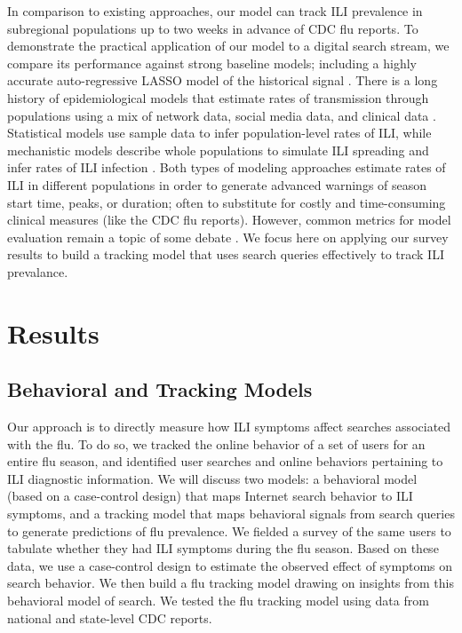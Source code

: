 \documentclass[fleqn,10pt]{wlscirep}
\begin{document}
In comparison to existing approaches, our model can track ILI prevalence in subregional populations up to two weeks in advance of CDC flu reports. To demonstrate the practical application of our model to a digital search stream, we compare its performance against strong baseline models; including a highly accurate auto-regressive LASSO model of the historical signal \cite{yang_etal_2015}. There is a long history of epidemiological models that estimate rates of transmission through populations using a mix of network data, social media data, and clinical data \cite{ginsberg_etal_2009,culotta2010towards,bodnar2013validating,nsoesie2014guess,generous2014global,yang_etal_2015inference,yang_etal_2015,biggerstaff_etal_2016,zhang2017forecasting}. Statistical models use sample data to infer population-level rates of ILI, while mechanistic models describe whole populations to simulate ILI spreading and infer rates of ILI infection \cite{biggerstaff_etal_2016}. Both types of modeling approaches estimate rates of ILI in different populations in order to generate advanced warnings of season start time, peaks, or duration; often to substitute for costly and time-consuming clinical measures (like the CDC flu reports). However, common metrics for model evaluation remain a topic of some debate \cite{biggerstaff_etal_2016}. We focus here on applying our survey results to build a tracking model that uses search queries effectively to track ILI prevalance. 

\section*{Results}

\subsection*{Behavioral and Tracking Models}

Our approach is to directly measure how ILI symptoms affect searches associated with the flu. To do so, we tracked the online behavior of a set of users for an entire flu season, and identified user searches and online behaviors pertaining to ILI diagnostic information. We will discuss two models: a behavioral model (based on a case-control design) that maps Internet search behavior to ILI symptoms, and a tracking model that maps behavioral signals from search queries to generate predictions of flu prevalence. We fielded a survey of the same users to tabulate whether they had ILI symptoms during the flu season. Based on these data, we use a case-control design to estimate the observed effect of symptoms on search behavior. We then build a flu tracking model drawing on insights from this behavioral model of search. We tested the flu tracking model using data from national and state-level CDC reports.  
\end{document}
